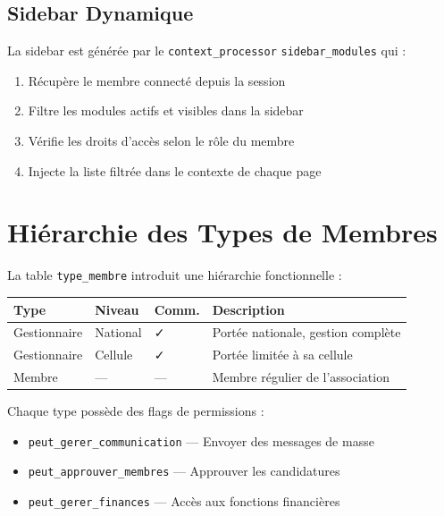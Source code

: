 \documentclass[12pt,a4paper]{article}
\begin{document}
\subsection{Sidebar Dynamique}

La sidebar est générée par le \texttt{context\_processor} \texttt{sidebar\_modules} qui :
\begin{enumerate}
    \item Récupère le membre connecté depuis la session
    \item Filtre les modules actifs et visibles dans la sidebar
    \item Vérifie les droits d'accès selon le rôle du membre
    \item Injecte la liste filtrée dans le contexte de chaque page
\end{enumerate}

\section{Hiérarchie des Types de Membres}

La table \texttt{type\_membre} introduit une hiérarchie fonctionnelle :

\begin{infobox}
\begin{tabularx}{\textwidth}{lllX}
\toprule
\textbf{Type} & \textbf{Niveau} & \textbf{Comm.} & \textbf{Description} \\
\midrule
Gestionnaire & National & \faCheck & Portée nationale, gestion complète \\
Gestionnaire & Cellule & \faCheck & Portée limitée à sa cellule \\
Membre & — & — & Membre régulier de l'association \\
\bottomrule
\end{tabularx}
\end{infobox}

Chaque type possède des flags de permissions :
\begin{itemize}
    \item \texttt{peut\_gerer\_communication} — Envoyer des messages de masse
    \item \texttt{peut\_approuver\_membres} — Approuver les candidatures
    \item \texttt{peut\_gerer\_finances} — Accès aux fonctions financières
\end{itemize}
\end{document}
